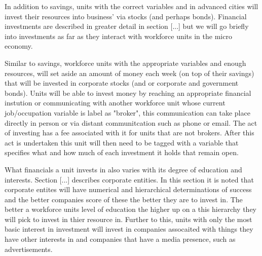 In addition to savings, units with the correct variables and in advanced cities will invest their resources into business' via stocks (and perhaps bonds). Financial investments are described in greater detail in section [...] but we will go briefly into investments as far as they interact with workforce units in the micro economy.

Similar to savings, workforce units with the appropriate variables and enough resources, will set aside an amount of money each week (on top of their savings) that will be invested in corporate stocks  (and or corporate and government bonds). Units will be able to invest money by reaching an appropriate financial instution or communicating with another workforce unit whose current job/occupation variable is label as "broker", this communication can take place directly in person or via distant communitcation such as phone or email. The act of investing has a fee associated with it for units that are not brokers. After this act is undertaken this unit will then need to be tagged with a variable that specifies what and how much of each investment it holds that remain open.     

What financials a unit invests in also varies with its degree of education and interests. Section [...] describes corporate entities. In this section it is noted that corporate entites will have numerical and hierarchical determinations of success and the better companies score of these the better they are to invest in. The better a workforce units level of education the higher up on a this hierarchy they will pick to invest in thier resource in. Further to this, units with only the most basic interest in investment will invest in companies assocaited with things they have other interests in and companies that have a media presence, such as advertisements.

%
%
